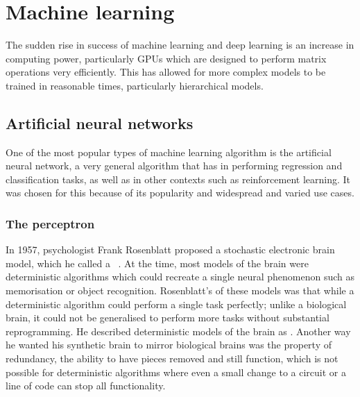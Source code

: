 
\chapter{Machine learning}

The sudden rise in success of machine learning and deep learning is  an increase in computing power, particularly \acp{GPU} which are designed to perform matrix operations very efficiently.
This has allowed for more complex models to be trained in reasonable times, particularly hierarchical models.

\section{Artificial neural networks}

One of the most popular types of machine learning algorithm is the artificial neural network, a very general algorithm that has  in performing regression and classification tasks, as well as in other contexts such as reinforcement learning.
It was chosen for this   because of its popularity and widespread and varied use cases.

\subsection{The perceptron}

In 1957, psychologist Frank Rosenblatt proposed a stochastic electronic brain model, which he called a ~\autocite{rosenblatt1957}.
At the time, most models of the brain were deterministic algorithms which could recreate a single neural phenomenon such as memorisation or object recognition.
Rosenblatt's  of these models was that while a deterministic algorithm could perform a single task perfectly; unlike a biological brain, it could not be generalised to perform more tasks without substantial reprogramming.
He described deterministic models of the brain as .
Another way he wanted his synthetic brain to mirror biological brains was the property of redundancy, the ability to have pieces removed and still function, which is not possible for deterministic algorithms where even a small change to a circuit or a line of code can stop all functionality.

